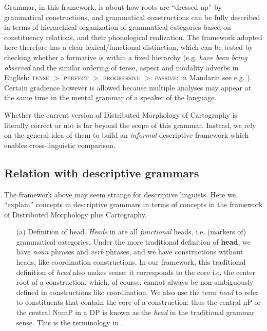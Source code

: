 \documentclass[UTF8, a4paper, oneside, scheme=plain, 12pt]{ctexrep}
\newcommand*{\textgt}{$>$ }
\newcommand*{\concept}[1]{\textbf{#1}}
\newcommand*{\term}[1]{\emph{#1}}
\newcommand{\form}[1]{\emph{#1}}
\newcommand*{\category}[1]{\textsc{#1}}
\begin{document}
{Grammar, in this framework, is about how roots are ``dressed up'' by grammatical constructions,
and grammatical constructions can be fully described
in terms of hierarchical organization of grammatical categories based on constituency relations, and their phonological realization.
The framework adopted here therefore has a clear lexical/functional distinction,
which can be tested by checking whether a formative is within a fixed hierarchy 
(e.g. \form{have been being observed} and the similar ordering of tense, aspect and modality adverbs in English: \category{tense} \textgt{}\category{perfect} \textgt{}\category{progressive} \textgt{}\category{passive}; 
in Mandarin see e.g. ).
Certain gradience however is allowed because multiple analyses may appear at the same time
in the mental grammar of a speaker of the language.

Whether the current version of Distributed Morphology of Cartography is literally correct or not 
is far beyond the scope of this grammar.
Instead, we rely on the general idea of them to build an \emph{informal} descriptive framework
which enables cross-linguistic comparison.

\subsection{Relation with descriptive grammars}\label{sec:theory.descriptive}

The framework above may seem strange for descriptive linguists.
Here we ``explain'' concepts in descriptive grammars in terms of concepts in the framework
of Distributed Morphology plus Cartography.

\begin{itemize}
    \item[(a)] Definition of head. \term{Heads} in  are all \emph{functional} heads,
    i.e. (markers of) grammatical categories.
    Under the more traditional definition of \concept{head},
    we have \emph{noun} phrases and \emph{verb} phrases,
    and we have constructions without heads, like coordination constructions.
    In our framework, this traditional definition of \term{head} also makes sense:
    it corresponds to the core i.e. the center root of a construction,
    which, of course, cannot always be non-ambiguously defined in constructions like coordination.
    We also use the term \term{head} to refer to constituents that contain the core of a construction:
    thus the central nP or the central NumP in a DP is known as the \term{head} in the traditional grammar sense.
    This is the terminology in \citet{cgel}.


\end{itemize}}
\end{document}
